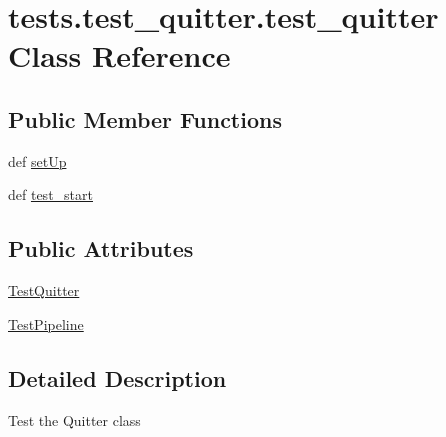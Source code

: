 \hypertarget{classtests_1_1test__quitter_1_1test__quitter}{\section{tests.\-test\-\_\-quitter.\-test\-\_\-quitter \-Class \-Reference}
\label{classtests_1_1test__quitter_1_1test__quitter}
}
\subsection*{\-Public \-Member \-Functions}
\begin{DoxyCompactItemize}
\item 
def \hyperlink{classtests_1_1test__quitter_1_1test__quitter_a32055c7bd8e8a786e8fc976f679ce803}{set\-Up}
\item 
def \hyperlink{classtests_1_1test__quitter_1_1test__quitter_ab8a5695da22b45a2512872eaca691004}{test\-\_\-start}
\end{DoxyCompactItemize}
\subsection*{\-Public \-Attributes}
\begin{DoxyCompactItemize}
\item 
\hyperlink{classtests_1_1test__quitter_1_1test__quitter_a3f057157de173528e9664708194c554b}{\-Test\-Quitter}
\item 
\hyperlink{classtests_1_1test__quitter_1_1test__quitter_ad40f139a184a0631012ccf8da57d6adc}{\-Test\-Pipeline}
\end{DoxyCompactItemize}


\subsection{\-Detailed \-Description}
\begin{DoxyVerb}Test the Quitter class\end{DoxyVerb}
 

